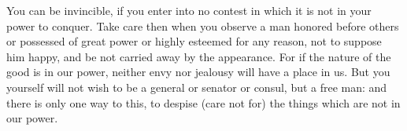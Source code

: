 You can be invincible, if you enter into  no contest in which it is not in your
power to conquer. Take  care then when you observe a  man honored before others
or possessed of great  power or highly esteemed for any  reason, not to suppose
him happy, and be not carried away by  the appearance. For if the nature of the
good is in  our power, neither envy nor  jealousy will have a place  in us. But
you yourself  will not wish to  be a general or  senator or consul, but  a free
man: and there  is only one way to  this, to despise (care not  for) the things
which are not in our power.
